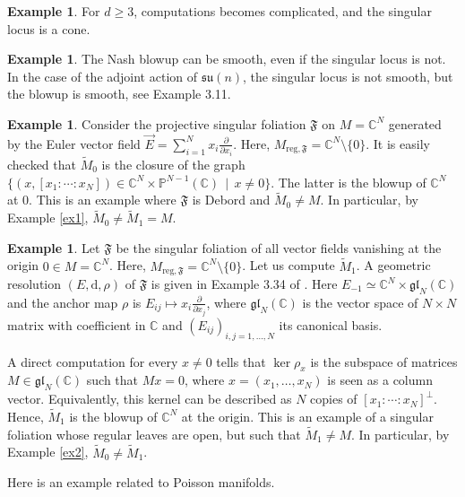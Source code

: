 \documentclass[10pt]{article}
\theoremstyle{plain}
\theoremstyle{definition}
\newtheorem{example}[lemma]{Example}
\theoremstyle{remark}
\newcommand{\dd}{\mathrm{d}}
\begin{document}
\begin{example}
For $d\geq 3$, computations becomes  complicated, and  the singular locus is a cone.

\begin{example}
    The Nash blowup can be smooth, even if the singular locus is not. In the case of the adjoint action of $\mathfrak{su}(n)$, the singular locus is not smooth, but the blowup is smooth, see Example 3.11\cite{louis2024nash}.
\end{example}
 \end{example}
\begin{example}
   Consider the projective singular foliation $\mathfrak F$  on  $M=\mathbb C^N$ generated by the Euler vector field $\overrightarrow{E}=\sum_{i=1}^Nx_i\frac{\partial}{\partial x_i}$. Here, $M_{\mathrm{reg},\mathfrak F}=\mathbb C^N\setminus \{0\}$. It is easily checked that $\widetilde M_0$ is the closure of the graph $\{(x,[x_1:\cdots: x_N])\in \mathbb C^N\times \mathbb P^{N-1}(\mathbb C)\,\mid\,  x\neq 0\}$. The latter is the blowup of $\mathbb C^N$ at $0$. This is an example where $\mathfrak F$ is Debord and $\widetilde M_0\neq M$. In particular, by Example \ref{ex1}, $\widetilde M_0\neq \widetilde M_1= M$.
\end{example}
\begin{example}Let $\mathfrak F$ be the  singular foliation of all vector fields vanishing at the origin $0\in M=\mathbb C^N$. Here, $M_{\mathrm{reg}, \mathfrak F}=\mathbb C^N\setminus {\{0\}}$. Let us compute $\widetilde M_1$. A geometric resolution $(E,\dd, \rho)$ of $\mathfrak F$ is given in  Example 3.34 of \cite{LLS}. Here $E_{-1}\simeq \mathbb C^N\times \mathfrak{gl}_N(\mathbb C)$ and the anchor map $\rho$ is $E_{ij}\mapsto x_i\frac{\partial }{\partial x_j}$, where $\mathfrak{gl}_N(\mathbb C)$ is the vector space of $N\times N$ matrix with coefficient in $\mathbb C$ and $(E_{ij})_{i,j=1,\ldots, N}$ its canonical basis.

A direct computation for every $x\neq 0$ tells that $\ker \rho_x$ is the subspace of matrices $M\in \mathfrak{gl}_N(\mathbb C)$ such that $Mx=0$, where $x=(x_1,\ldots, x_N)$ is seen as a column vector. Equivalently, this kernel can be described as $N$ copies of $[x_1:\cdots: x_N]^{\perp}$. Hence, $\widetilde M_1$ is the blowup of $\mathbb C^N$ at the origin. This is an example of a
singular foliation whose regular leaves are open, but such that $\widetilde M_1\neq M$. In particular,  by Example \ref{ex2}, $\widetilde M_0\neq \widetilde M_1$. 
\end{example}
Here is an example related to Poisson manifolds.
\end{document}
